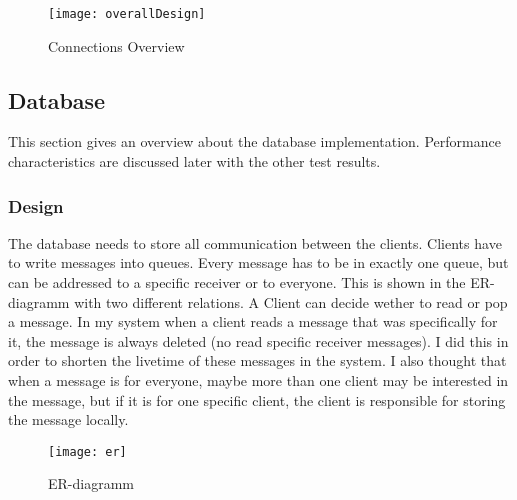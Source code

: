 \documentclass[
10pt, %
a4paper, %
oneside, %
headinclude,footinclude, %
BCOR5mm, %
]{scrartcl}
\begin{document}
\begin{figure}[h]
\centering 
\texttt{[image: overallDesign]} 
\caption{Connections Overview} %
\end{figure}


\subsection{Database}
This section gives an overview about the database implementation. Performance characteristics are discussed later with the other test results.

\subsubsection{Design}
The database needs to store all communication between the clients. Clients have to write messages into queues. Every message has to be in exactly one queue, but can be addressed to a specific receiver or to everyone. This is shown in the ER-diagramm with two different relations. A Client can decide wether to read or pop a message. In my system when a client reads a message that was specifically for it, the message is always deleted (no read specific receiver messages). I did this in order to shorten the livetime of these messages in the system. I also thought that when a message is for everyone, maybe more than one client may be interested in the message, but if it is for one specific client, the client is responsible for storing the message locally. 

\begin{figure}[h]
\centering
\texttt{[image: er]}
\caption{ER-diagramm}
\end{figure}
\end{document}
